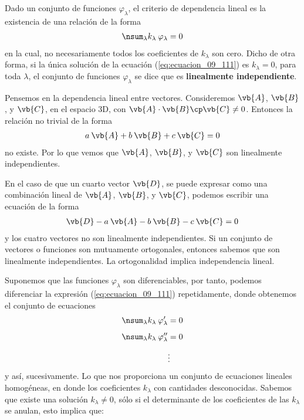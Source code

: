 Dado un conjunto de funciones $\varphi_{\lambda}$, el criterio de dependencia lineal es la existencia de una relación de la forma
\begin{align}
\nsum_{\lambda} k_{\lambda} \: \varphi_{\lambda} = 0 
\label{eq:ecuacion_09_111}
\end{align}
en la cual, no necesariamente todos los coeficientes de $k_{\lambda}$ son cero. Dicho de otra forma, si la única solución de la ecuación (\ref{eq:ecuacion_09_111}) es $k_{\lambda} = 0$, para toda $\lambda$, el conjunto de funciones $\varphi_{\lambda}$ se dice que es \textbf{linealmente independiente}.
\par
Pensemos en la dependencia lineal entre vectores. Consideremos $\vb{A}$, $\vb{B}$, y $\vb{C}$, en el espacio 3D, con $\vb{A} \cdot \vb{B} \cp \vb{C} \neq 0$. Entonces la relación no trivial de la forma
\begin{align}
a \: \vb{A} + b \: \vb{B} + c \: \vb{C} = 0
\label{eq:ecuacion_09_112}
\end{align}
no existe. Por lo que vemos que $\vb{A}$, $\vb{B}$, y $\vb{C}$ son linealmente independientes.
\par
En el caso de que un cuarto vector $\vb{D}$, se puede expresar como una combinación lineal de $\vb{A}$, $\vb{B}$, y $\vb{C}$, podemos escribir una ecuación de la forma
\begin{align}
\vb{D} -  a \: \vb{A} - b \: \vb{B} - c \: \vb{C} = 0
\label{eq:ecuacion_09_113}
\end{align}
y los cuatro vectores no son linealmente independientes. Si un conjunto de vectores o funciones son mutuamente ortogonales, entonces sabemos que son linealmente independientes. La ortogonalidad implica independencia lineal.
\par
Suponemos que las funciones $\varphi_{\lambda}$ son diferenciables, por tanto, podemos diferenciar la expresión (\ref{eq:ecuacion_09_111}) repetidamente, donde obtenemos el conjunto de ecuaciones
\begin{align}
\nsum_{\lambda} k_{\lambda} \: \varphi^{\prime}_{\lambda} &= 0 \label{eq:ecuacion_09_114} \\[0.5em]
\nsum_{\lambda} k_{\lambda} \: \varphi^{\prime \prime}_{\lambda} &= 0 \label{eq:ecuacion_09_115} \\[0.5em]
&\vdots \nonumber
\end{align}
y así, sucesivamente. Lo que nos proporciona un conjunto de ecuaciones lineales homogéneas, en donde los coeficientes $k_{\lambda}$ con cantidades desconocidas. Sabemos que existe una solución $k_{\lambda} \neq 0$, sólo si el determinante de los coeficientes de las $k_{\lambda}$ se anulan, esto implica que:
